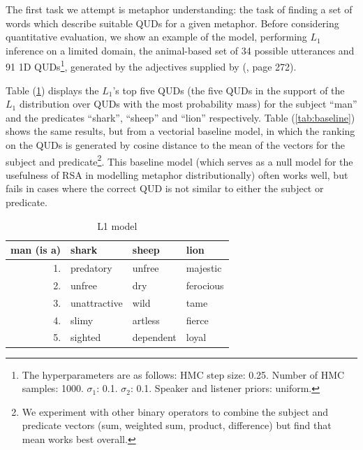 \documentclass[10pt,letterpaper,twocolumn]{article}
\begin{document}
The first task we attempt is metaphor understanding: the task of finding a set of words which describe suitable QUDs for a given metaphor. Before considering quantitative evaluation, we show an example of the model, performing $L_1$ inference on a limited domain, the animal-based set of 34 possible utterances and 91 1D QUDs\footnote{The hyperparameters are as follows: HMC step size: 0.25. Number of HMC samples: 1000. $\sigma_1$: 0.1. $\sigma_2$: 0.1. Speaker and listener priors: uniform.}, generated by the adjectives supplied by (\cite{kao}, page 272). 

Table (\ref{tab:l1}) displays the $L_1$'s top five QUDs (the five QUDs in the support of the $L_1$ distribution over QUDs with the most probability mass) for the subject ``man'' and the predicates ``shark'', ``sheep'' and ``lion'' respectively. Table (\ref{tab:baseline}) shows the same results, but from a vectorial baseline model, in which the ranking on the QUDs is generated by cosine distance to the mean of the vectors for the subject and predicate\footnote{We experiment with other binary operators to combine the subject and predicate vectors (sum, weighted sum, product, difference) but find that mean works best overall.}. This baseline model (which serves as a null model for the usefulness of RSA in modelling metaphor distributionally) often works well, but fails in cases where the correct QUD is not similar to either the subject or predicate. 





\begin{table}[ht]
	\label{tab:l1}
	\caption{L1 model}
	\centering
	\begin{tabular}{rlll}
	man (is a) & shark & sheep & lion \\\toprule
	1. & predatory & unfree & majestic \\
	2. & unfree & dry & ferocious \\
	3. & unattractive & wild & tame \\
	4. & slimy & artless & fierce \\
	5. & sighted & dependent & loyal \\\bottomrule
	\end{tabular}
\end{table}
\end{document}

